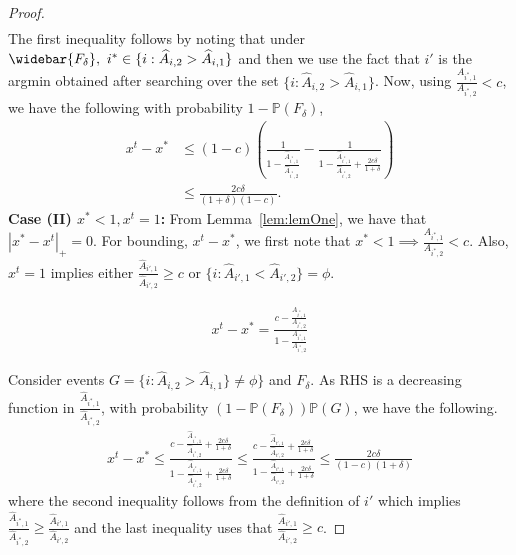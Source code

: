 \begin{proof}
\begin{align*}
\end{align*}
The first inequality follows by noting that under $\widebar{F_\delta},\ i^*\in \{i: \widehat{A}_{i, 2}>\widehat{A}_{i, 1}\}$ and then we use the fact that $i'$ is the argmin obtained after searching over the set $\{i: \widehat{A}_{i, 2}>\widehat{A}_{i, 1}\}$. Now, using $\frac{A_{i^*, 1}}{A_{i^*, 2}}<c$, we have the following with probability $1-\mathbb{P}(F_\delta)$,
\begin{align*}
    x^t-x^* &\leq (1-c) \left(\frac{1}{1-\frac{\widehat{A}_{i^*,1}}{\widehat{A}_{i^*,2}}}-\frac{1}{1-\frac{\widehat{A}_{i^*, 1}}{\widehat{A}_{i^*, 2}} + \frac{2c\delta}{1+\delta}}\right)\\
    &\leq \frac{2c\delta}{(1+\delta)(1-c)}.
\end{align*}
\newline
\textbf{Case (II) $x^*<1, x^t=1$:} From Lemma~\ref{lem:lemOne}, we have that $|x^*-x^t|_+=0$.
For bounding, $x^t-x^*$, we first note that $x^*<1\implies \frac{A_{i^*, 1}}{A_{i^*, 2}}<c$. Also, $x^t=1 $ implies either $ \frac{\widehat{A}_{i', 1}}{\widehat{A}_{i', 2}}\geq c$ or $\{i:\widehat{A}_{i', 1}<\widehat{A}_{i', 2}\}=\phi$.

\begin{align*}
    x^t-x^* = \frac{c-\frac{A_{i^*, 1}}{A_{i^*, 2}}}{1-\frac{A_{i^*, 1}}{A_{i^*, 2}}} 
\end{align*}

Consider events $G = \{i:\widehat{A}_{i, 2}> \widehat{A}_{i, 1}\}\neq \phi\}$ and $F_\delta$. As RHS is a decreasing function in $\frac{\widehat{A}_{i^*, 1}}{\widehat{A}_{i^*, 2}}$, with probability $\left(1-\mathbb{P}(F_\delta)\right)\mathbb{P}(G)$, we have the following.
\begin{align*}
    x^t-x^* \leq \frac{c-\frac{\widehat{A}_{i^*, 1}}{\widehat{A}_{i^*, 2}} + \frac{2c\delta}{1+\delta}}{1-\frac{\widehat{A}_{i^*, 1}}{\widehat{A}_{i^*, 2}} + \frac{2c\delta}{1+\delta}}
    \leq \frac{c-\frac{\widehat{A}_{i', 1}}{\widehat{A}_{i', 2}} + \frac{2c\delta}{1+\delta}}{1-\frac{\widehat{A}_{i', 1}}{\widehat{A}_{i', 2}} + \frac{2c\delta}{1+\delta}} \leq \frac{2c\delta}{(1-c)(1+\delta)}
\end{align*}
where the second inequality follows from the definition of $i'$ which implies $\frac{\widehat{A}_{i^*, 1}}{\widehat{A}_{i^*, 2}}\geq \frac{\widehat{A}_{i', 1}}{\widehat{A}_{i', 2}}$ and the last inequality uses that $\frac{\widehat{A}_{i', 1}}{\widehat{A}_{i', 2}}\geq c$.


\end{proof}

